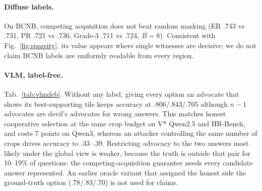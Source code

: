 \documentclass[10pt,twocolumn,letterpaper]{article}
\begin{document}
\paragraph{Diffuse labels.} On BCNB, competing acquisition does not beat random masking (ER .743 vs .731, PR .721 vs .736, Grade-3 .711 vs .724, $B{=}8$). Consistent with Fig.~\ref{fig:sparsity}, its value appears where single witnesses are decisive; we do not claim BCNB labels are uniformly readable from every region.

\paragraph{VLM, label-free.} \begin{table}[t]\centering\small
\caption{\textbf{Label-free VLM advocacy} (accuracy, 95\% CI; global view always shown). $n$ = number of options (2 or 4). Advocates and attackers choose among the same grid tiles using the judge's option scores.}\label{tab:vlmdeb}
\setlength{\tabcolsep}{2pt}
\end{table}
Tab.~\ref{tab:vlmdeb}. Without any label, giving every option an advocate that shows its best-supporting tile keeps accuracy at .806/.843/.705 although $n{-}1$ advocates are devil's advocates for wrong answers. This matches honest cooperative selection at the same crop budget on V* Qwen2.5 and HR-Bench, and costs 7 points on Qwen3, whereas an attacker controlling the same number of crops drives accuracy to .33--.39. Restricting advocacy to the two answers most likely under the global view is weaker, because the truth is outside that pair for 10--19\% of questions: the competing-acquisition guarantee needs every candidate answer represented. An earlier oracle variant that assigned the honest side the ground-truth option (.78/.83/.70) is not used for claims.
\end{document}

